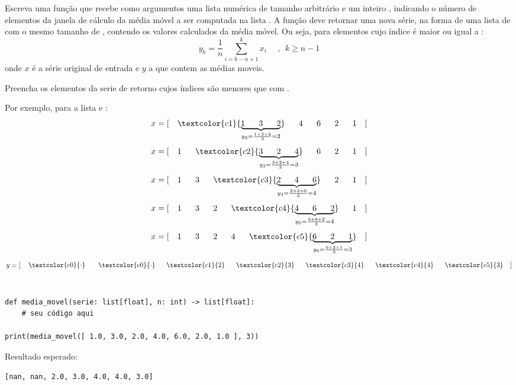 
Escreva uma função  que recebe como argumentos uma
lista numérica  de tamanho arbitrário e um inteiro , indicando o
número de elementos da janela de cálculo da média móvel a ser computada na lista .
A função deve retornar uma nova série, na forma de uma lista de  com o  mesmo tamanho de ,
contendo os valores calculados da média móvel.
Ou seja, para elementos cujo índice é maior ou igual a :
\begin{equation}
    y_{k} =
        \dfrac{1}{n}\sum_{i=k-n+1}^k x_i \ \ \ \ \ \ , \ \   k \geq n-1
\end{equation}
onde $x$ é a série original de entrada e $y$ a que contem as médias moveis.

Preencha os elementos da serie de retorno cujos índices são menores que  com \inlcode{)}.

Por exemplo, para a lista \inlcode{[ 1.0, 3.0, 2.0, 4.0, 6.0, 2.0, 1.0 ]} e :
    $$
    x = [~~~ \textcolor{c1}{\underbrace{1~~~~~ 3~~~~~ 2}_{y_2 = \frac{1+3+2}{3}=2}}~~~~~ 4~~~~~ 6~~~~~ 2~~~~~ 1~~~ ]
    $$
    \vspace{-3mm}$$
    x = [~~~ 1~~~~~ \textcolor{c2}{\underbrace{3~~~~~ 2~~~~~ 4}_{y_3 = \frac{3+2+4}{3}=3}}~~~~~ 6~~~~~ 2~~~~~ 1~~~ ]
    $$
    \vspace{-3mm}$$
    x = [~~~ 1~~~~~ 3~~~~~ \textcolor{c3}{\underbrace{ 2~~~~~ 4~~~~~ 6}_{y_4 = \frac{2+4+6}{3}=4}}~~~~~ 2~~~~~ 1~~~ ]
    $$
    \vspace{-3mm}$$
    x = [~~~ 1~~~~~ 3~~~~~ 2~~~~~ \textcolor{c4}{\underbrace{ 4~~~~~ 6~~~~~ 2}_{y_5 = \frac{4+6+2}{3}=4}}~~~~~ 1~~~]
    $$
    \vspace{-3mm}$$
    x = [~~~ 1~~~~~ 3~~~~~ 2~~~~~ 4~~~~~ \textcolor{c5}{\underbrace{ 6~~~~~ 2~~~~~ 1}_{y_6 = \frac{6+2+1}{3}=3}} ~~~]
    $$
    \vspace{-3mm}$$
    y = [~~~ \, \textcolor{c0}{\cdot} \; ~~~~~ \textcolor{c0}{\cdot} ~~~~~ \textcolor{c1}{2}~~~~~ \textcolor{c2}{3}~~~~~ \textcolor{c3}{4}~~~~~ \textcolor{c4}{4}~~~~~ \textcolor{c5}{3}~~~ ]
    $$
    \\

\begin{verbatim}
def media_movel(serie: list[float], n: int) -> list[float]:
    # seu código aqui

print(media_movel([ 1.0, 3.0, 2.0, 4.0, 6.0, 2.0, 1.0 ], 3))
\end{verbatim}

Resultado esperado:
\begin{verbatim}
[nan, nan, 2.0, 3.0, 4.0, 4.0, 3.0]
\end{verbatim}




